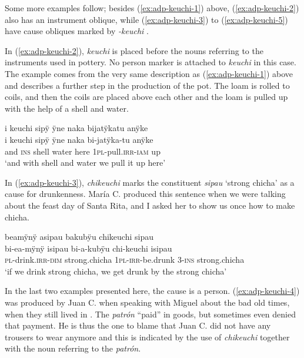 Some more examples follow; besides (\ref{ex:adp-keuchi-1}) above, (\ref{ex:adp-keuchi-2}) also has an instrument oblique, while (\ref{ex:adp-keuchi-3}) to (\ref{ex:adp-keuchi-5}) have cause obliques marked by \textit{-keuchi} .



In (\ref{ex:adp-keuchi-2}), \textit{keuchi} is placed before the nouns referring to the instruments used in pottery. No person marker is attached to \textit{keuchi} in this case. The example comes from the very same description as (\ref{ex:adp-keuchi-1}) above and describes a further step in the production of the pot. The loam is rolled to coils, and then the coils are placed above each other and the loam is pulled up with the help of a shell and water. 

\ea\label{ex:adp-keuchi-2}
\begingl
\glpreamble i keuchi sipÿ ÿne naka bijatÿkatu anÿke\\
\gla i keuchi sipÿ ÿne naka bi-jatÿka-tu anÿke\\
\glb and \textsc{ins} shell water here 1\textsc{pl}-pull.\textsc{irr}-\textsc{iam} up\\
\glft ‘and with shell and water we pull it up here’
\endgl
\trailingcitation{[jmx-d110918ls-2.18-19]}
\xe

In (\ref{ex:adp-keuchi-3}), \textit{chikeuchi} marks the constituent \textit{sipau} ‘strong chicha’ as a cause for drunkenness. María C. produced this sentence when we were talking about the feast day of Santa Rita, and I asked her to show us once how to make chicha. 

\ea\label{ex:adp-keuchi-3}
\begingl
\glpreamble beamÿnÿ asipau bakubÿu chikeuchi sipau\\
\gla bi-ea-mÿnÿ isipau bi-a-kubÿu chi-keuchi isipau\\
\textsc{pl}-drink.\textsc{irr}-\textsc{dim} strong.chicha 1\textsc{pl}-\textsc{irr}-be.drunk 3-\textsc{ins} strong.chicha\\
\glft ‘if we drink strong chicha, we get drunk by the strong chicha’
\endgl
\trailingcitation{[uxx-p110825l.296]}
\xe

In the last two examples presented here, the cause is a person. (\ref{ex:adp-keuchi-4}) was produced by Juan C. when speaking with Miguel about the bad old times, when they still lived in . The \textit{patrón} “paid” in goods, but sometimes even denied that payment. He is thus the one to blame that Juan C. did not have any trousers to wear anymore and this is indicated by the use of \textit{chikeuchi} together with the noun referring to the \textit{patrón}.


